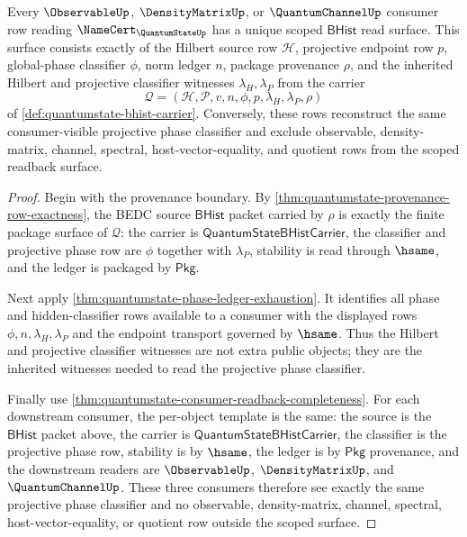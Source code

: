 \begin{theorem}
\label{thm:quantumstate-phase-provenance-scoped-readback}
Every $\ObservableUp$, $\DensityMatrixUp$, or $\QuantumChannelUp$ consumer
row reading $\NameCert_{\QuantumStateUp}$ has a unique scoped
$\mathsf{BHist}$ read surface. This surface consists exactly of the Hilbert
source row $\mathcal{H}$, projective endpoint row $p$, global-phase
classifier $\phi$, norm ledger $n$, package provenance $\rho$, and the
inherited Hilbert and projective classifier witnesses $\lambda_H,\lambda_P$
from the carrier
$$
\mathcal{Q}=(\mathcal{H},\mathcal{P},v,n,\phi,p,\lambda_H,\lambda_P,\rho)
$$
of \autoref{def:quantumstate-bhist-carrier}. Conversely, these rows
reconstruct the same consumer-visible projective phase classifier and
exclude observable, density-matrix, channel, spectral,
host-vector-equality, and quotient rows from the scoped readback surface.
\end{theorem}
\begin{proof}
Begin with the provenance boundary. By
\autoref{thm:quantumstate-provenance-row-exactness}, the BEDC source
$\mathsf{BHist}$ packet carried by $\rho$ is exactly the finite package
surface of $\mathcal{Q}$: the carrier is
$\mathsf{QuantumStateBHistCarrier}$, the classifier and projective phase row
are $\phi$ together with $\lambda_P$, stability is read through $\hsame$,
and the ledger is packaged by $\mathsf{Pkg}$.

Next apply \autoref{thm:quantumstate-phase-ledger-exhaustion}. It identifies
all phase and hidden-classifier rows available to a consumer with the
displayed rows $\phi,n,\lambda_H,\lambda_P$ and the endpoint transport
governed by $\hsame$. Thus the Hilbert and projective classifier witnesses
are not extra public objects; they are the inherited witnesses needed to
read the projective phase classifier.

Finally use \autoref{thm:quantumstate-consumer-readback-completeness}. For
each downstream consumer, the per-object template is the same: the source
is the $\mathsf{BHist}$ packet above, the carrier is
$\mathsf{QuantumStateBHistCarrier}$, the classifier is the projective phase
row, stability is by $\hsame$, the ledger is by $\mathsf{Pkg}$ provenance,
and the downstream readers are $\ObservableUp$, $\DensityMatrixUp$, and
$\QuantumChannelUp$. These three consumers therefore see exactly the same
projective phase classifier and no observable, density-matrix, channel,
spectral, host-vector-equality, or quotient row outside the scoped surface.
\end{proof}
